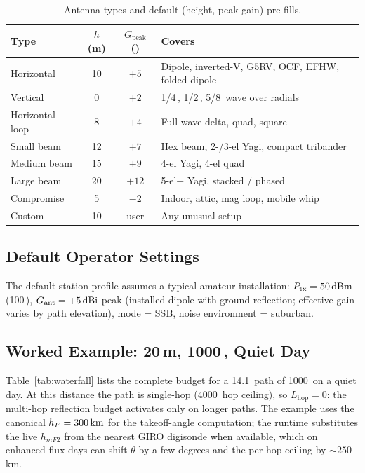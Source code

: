\documentclass[11pt,a4paper]{article}
\newcommand{\SI}[2]{#1\,\text{#2}}
\newcommand{\si}[1]{\text{#1}}
\newcommand{\dBm}{\text{dBm}}
\newcommand{\dBi}{\text{dBi}}
\newcommand{\MHz}{\text{MHz}}
\newcommand{\km}{\text{km}}
\newcommand{\W}{\text{W}}
\begin{document}
\begin{table}[H]
\centering
\small
\caption{Antenna types and default (height, peak gain) pre-fills.}
\label{tab:anttypes}
\begin{tabular}{@{}lccl@{}}
\toprule
\textbf{Type} & \textbf{$h$ (m)} & \textbf{$G_{\text{peak}}$ (\si{\dBi})} & \textbf{Covers} \\
\midrule
Horizontal      & 10 & $+5$  & Dipole, inverted-V, G5RV, OCF, EFHW, folded dipole \\
Vertical        &  0 & $+2$  & \SI{1/4}{}, \SI{1/2}{}, \SI{5/8}{} wave over radials \\
Horizontal loop &  8 & $+4$  & Full-wave delta, quad, square \\
Small beam      & 12 & $+7$  & Hex beam, 2-/3-el Yagi, compact tribander \\
Medium beam     & 15 & $+9$  & 4-el Yagi, 4-el quad \\
Large beam      & 20 & $+12$ & 5-el+ Yagi, stacked / phased \\
Compromise      &  5 & $-2$  & Indoor, attic, mag loop, mobile whip \\
Custom          & 10 & user  & Any unusual setup \\
\bottomrule
\end{tabular}
\end{table}

\subsection{Default Operator Settings}

The default station profile assumes a typical amateur installation:
$P_{\text{tx}} = \SI{50}{\dBm}$ (\SI{100}{\W}),
$G_{\text{ant}} = \SI{+5}{\dBi}$ peak (installed dipole with ground
reflection; effective gain varies by path elevation), mode = SSB,
noise environment = suburban.

\subsection{Worked Example: 20\,m, \SI{1000}{\km}, Quiet Day}

Table~\ref{tab:waterfall} lists the complete budget for a
\SI{14.1}{\MHz} path of \SI{1000}{\km} on a quiet day.  At this
distance the path is single-hop (\SI{4000}{\km} hop ceiling), so
$L_{\text{hop}} = 0$: the multi-hop reflection budget activates
only on longer paths.  The example uses the canonical
$h_F = \SI{300}{\km}$ for the takeoff-angle computation; the
runtime substitutes the live $h_{m\!F2}$ from the nearest GIRO
digisonde when available, which on enhanced-flux days can shift
$\theta$ by a few degrees and the per-hop ceiling by
${\sim}\!250$\,km.
\end{document}

